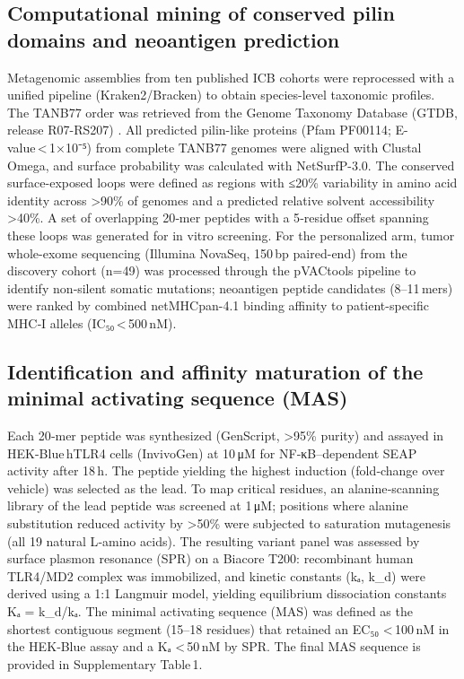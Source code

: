 \documentclass{article}
\begin{document}
\subsection{Computational mining of conserved pilin domains and neoantigen prediction}
Metagenomic assemblies from ten published ICB cohorts \cite{Thomas2019, Cheng2020, McCulloch2022} were reprocessed with a unified pipeline (Kraken2/Bracken) to obtain species-level taxonomic profiles. The TANB77 order was retrieved from the Genome Taxonomy Database (GTDB, release R07-RS207) \cite{Parks2022}. All predicted pilin-like proteins (Pfam PF00114; E-value < 1×10⁻⁵) from complete TANB77 genomes were aligned with Clustal Omega, and surface probability was calculated with NetSurfP-3.0. The conserved surface-exposed loops were defined as regions with ≤20\% variability in amino acid identity across >90\% of genomes and a predicted relative solvent accessibility >40\%. A set of overlapping 20‑mer peptides with a 5‑residue offset spanning these loops was generated for in vitro screening. For the personalized arm, tumor whole-exome sequencing (Illumina NovaSeq, 150 bp paired-end) from the discovery cohort (n=49) \cite{Chen2023TANB77} was processed through the pVACtools pipeline \cite{Hundal2020} to identify non‑silent somatic mutations; neoantigen peptide candidates (8–11 mers) were ranked by combined netMHCpan-4.1 binding affinity to patient-specific MHC‑I alleles (IC₅₀ < 500 nM).

\subsection{Identification and affinity maturation of the minimal activating sequence (MAS)}
Each 20‑mer peptide was synthesized (GenScript, >95\% purity) and assayed in HEK-Blue hTLR4 cells (InvivoGen) at 10 μM for NF‑κB–dependent SEAP activity after 18 h. The peptide yielding the highest induction (fold‑change over vehicle) was selected as the lead. To map critical residues, an alanine‑scanning library of the lead peptide was screened at 1 μM; positions where alanine substitution reduced activity by >50\% were subjected to saturation mutagenesis (all 19 natural L‑amino acids). The resulting variant panel was assessed by surface plasmon resonance (SPR) on a Biacore T200: recombinant human TLR4/MD2 complex was immobilized, and kinetic constants (kₐ, k_d) were derived using a 1:1 Langmuir model, yielding equilibrium dissociation constants Kₐ = k_d/kₐ. The minimal activating sequence (MAS) was defined as the shortest contiguous segment (15–18 residues) that retained an EC₅₀ < 100 nM in the HEK‑Blue assay and a Kₐ < 50 nM by SPR. The final MAS sequence is provided in Supplementary Table 1.
\end{document}
